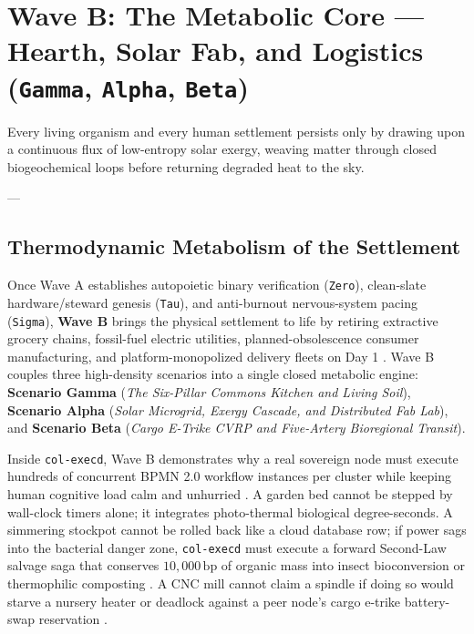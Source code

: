 \chapter{Wave B: The Metabolic Core --- Hearth, Solar Fab, and Logistics (\texttt{Gamma}, \texttt{Alpha}, \texttt{Beta})}
\label{ch:wave-b}

\epigraph{Every living organism and every human settlement persists only by drawing upon a continuous flux of low-entropy solar exergy, weaving matter through closed biogeochemical loops before returning degraded heat to the sky.}{--- \textcite{georgescu1971}}

\section{Thermodynamic Metabolism of the Settlement}
\label{sec:wave-b-intro}

Once Wave A establishes autopoietic binary verification (\texttt{Zero}), clean-slate
hardware/steward genesis (\texttt{Tau}), and anti-burnout nervous-system pacing
(\texttt{Sigma}), \textbf{Wave B} brings the physical settlement to life by retiring
extractive grocery chains, fossil-fuel electric utilities, planned-obsolescence consumer
manufacturing, and platform-monopolized delivery fleets on Day 1 \parencite{odum1971,raworth2017}.
Wave B couples three high-density scenarios into a single closed metabolic engine:
\textbf{Scenario Gamma} (\textit{The Six-Pillar Commons Kitchen and Living Soil}),
\textbf{Scenario Alpha} (\textit{Solar Microgrid, Exergy Cascade, and Distributed Fab Lab}),
and \textbf{Scenario Beta} (\textit{Cargo E-Trike CVRP and Five-Artery Bioregional Transit}).

Inside \texttt{col-execd}, Wave B demonstrates why a real sovereign node must execute
hundreds of concurrent BPMN 2.0 workflow instances per cluster while keeping human cognitive
load calm and unhurried \parencite{vanderaalst1998application,weiser1996calm}. A garden bed
cannot be stepped by wall-clock timers alone; it integrates photo-thermal biological degree-seconds.
A simmering stockpot cannot be rolled back like a cloud database row; if power sags into the
bacterial danger zone, \texttt{col-execd} must execute a forward Second-Law salvage saga that
conserves $10{,}000\,\mathrm{bp}$ of organic mass into insect bioconversion or thermophilic
composting \parencite{garciamolina1987sagas}. A CNC mill cannot claim a spindle if doing so
would starve a nursery heater or deadlock against a peer node's cargo e-trike battery-swap
reservation \parencite{coffman1971deadlocks}.

